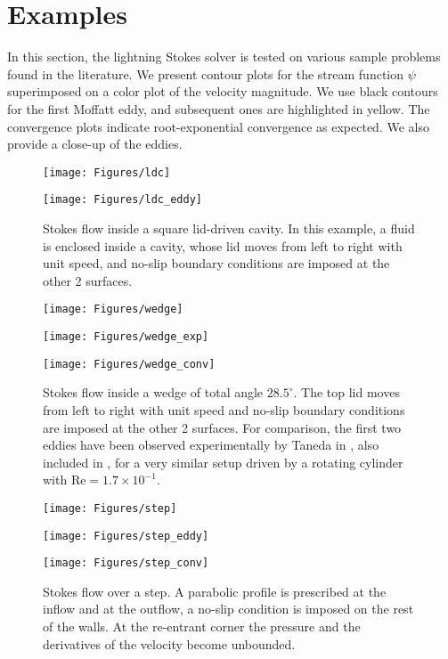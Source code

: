 
\section{Examples \label{sec:results}}
In this section, the lightning Stokes solver is tested on various sample problems found in the literature. We present contour plots for the stream function $\psi$ superimposed on a color plot of the velocity magnitude. We use black contours for the first Moffatt eddy, and subsequent ones are highlighted in yellow. The convergence plots indicate root-exponential convergence as expected. We also provide a close-up of the eddies.

\begin{figure}[H]
	\centering
	\texttt{[image: Figures/ldc]}
	
	\vspace{2em}
	\texttt{[image: Figures/ldc\_eddy]}
	\label{fig:ldc}
	\caption{Stokes flow inside a square lid-driven cavity. In this example, a fluid is enclosed inside a cavity, whose lid moves from left to right with unit speed, and no-slip boundary conditions are imposed at the other 2 surfaces.}
\end{figure} 

\begin{figure}[H]
	\centering
	\begin{minipage}{0.45\linewidth}
		\centering
		\texttt{[image: Figures/wedge]}
	\end{minipage}
	\hfill
	\begin{minipage}{0.45\linewidth}
		\centering
		\texttt{[image: Figures/wedge\_exp]}
	\end{minipage}

	\texttt{[image: Figures/wedge\_conv]}
	
	
	\label{fig:wedge}
	\caption{Stokes flow inside a wedge of total angle $28.5^\circ$. The top lid moves from left to right with unit speed and no-slip boundary conditions are imposed at the other 2 surfaces. For comparison, the first two eddies have been observed experimentally by Taneda in \cite[Fig.~19]{taneda79}, also included in \cite[Fig.~10]{vandyke82}, for a very similar setup driven by a rotating cylinder with $\text{Re}=1.7\times10^{-1}$.}
\end{figure} 

\begin{figure}[H]
	\centering
	\texttt{[image: Figures/step]}
	
	\vspace{2em}
	\texttt{[image: Figures/step\_eddy]}
	
	\vspace{2em}
	\texttt{[image: Figures/step\_conv]}
	
	\label{fig:step}
	\caption{Stokes flow over a step. A parabolic profile is prescribed at the inflow and at the	outflow, a no-slip condition is imposed on the rest of the walls. At the re-entrant corner the pressure and the derivatives of the velocity become unbounded.}
\end{figure} 

